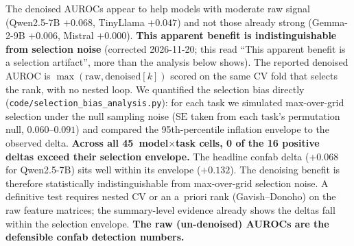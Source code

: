 \documentclass[11pt,a4paper]{article}
\begin{document}
The denoised AUROCs appear to help models with moderate raw signal
(Qwen2.5-7B $+0.068$, TinyLlama $+0.047$) and not those already strong
(Gemma-2-9B $+0.006$, Mistral $+0.000$). \textbf{This apparent benefit
is indistinguishable from selection noise} (corrected 2026-11-20; this
read ``This apparent benefit is a selection artifact'', more than the
analysis below shows). The reported denoised AUROC is
$\max(\text{raw},\allowbreak \text{denoised}[k])$ scored on the same CV fold that
selects the rank, with no nested loop. We quantified the selection
bias directly (\texttt{code/selection\_bias\_analysis.py}): for each
task we simulated max-over-grid selection under the null sampling noise
($\text{SE}$ taken from each task's permutation null, $0.060$--$0.091$)
and compared the 95th-percentile inflation envelope to the observed
delta. \textbf{Across all 45~model$\times$task cells, 0 of the 16
positive deltas exceed their selection envelope.} The headline confab
delta ($+0.068$ for Qwen2.5-7B) sits well within its envelope
($+0.132$). The denoising benefit is therefore statistically
indistinguishable from max-over-grid selection noise. A definitive
test requires nested CV or an a~priori rank (Gavish--Donoho) on the
raw feature matrices; the summary-level evidence already shows the
deltas fall within the selection envelope. \textbf{The raw
(un-denoised) AUROCs are the defensible confab detection numbers.}
\end{document}
